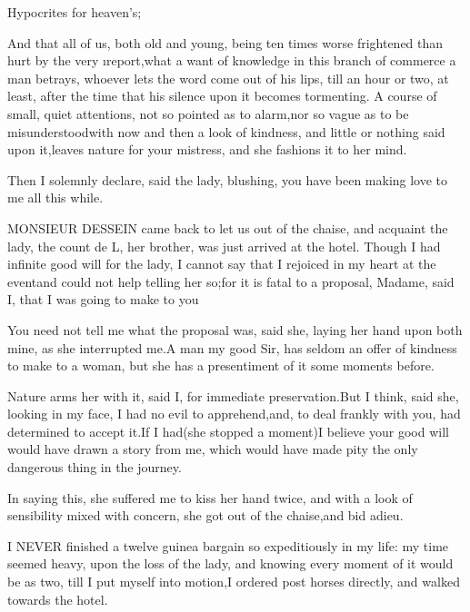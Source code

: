 \documentclass[twoside]{article}
\begin{document}
Hypocrites for heaven’s;\tsk 

And that all of us, both old and young, being ten times worse frightened
than hurt by the very \i{report},\tsk what a want of knowledge in this branch
of commerce a man betrays, whoever lets the word come out of his lips,
till an hour or two, at least, after the time that his silence upon it
becomes tormenting.  A course of small, quiet attentions, not so pointed
as to alarm,\tsk nor so vague as to be misunderstood\tsk with now and then a look
of kindness, and little or nothing said upon it,\tsk leaves nature for your
mistress, and she fashions it to her mind.\tsk 

Then I solemnly declare, said the lady, blushing, you have been making
love to me all this while.






MONSIEUR DESSEIN came back to let us out of the chaise, and acquaint the
lady, the count de L\tsk , her brother, was just arrived at the hotel.
Though I had infinite good will for the lady, I cannot say that I
rejoiced in my heart at the event\tsk and could not help telling her so;\tsk for
it is fatal to a proposal, Madame, said I, that I was going to make to
you\tsk 

\tsk You need not tell me what the proposal was, said she, laying her hand
upon both mine, as she interrupted me.\tsk A man my good Sir, has seldom an
offer of kindness to make to a woman, but she has a presentiment of it
some moments before.\tsk 

Nature arms her with it, said I, for immediate preservation.\tsk But I think,
said she, looking in my face, I had no evil to apprehend,\tsk and, to deal
frankly with you, had determined to accept it.\tsk If I had\tsk (she stopped a
moment)\tsk I believe your good will would have drawn a story from me, which
would have made pity the only dangerous thing in the journey.

In saying this, she suffered me to kiss her hand twice, and with a look
of sensibility mixed with concern, she got out of the chaise,\tsk and bid
adieu.






I NEVER finished a twelve guinea bargain so expeditiously in my life: my
time seemed heavy, upon the loss of the lady, and knowing every moment of
it would be as two, till I put myself into motion,\tsk I ordered post horses
directly, and walked towards the hotel.
\end{document}
